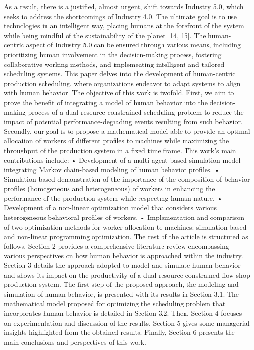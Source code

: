 As a result, there is a justified, almost urgent, shift towards Industry 5.0, which seeks to address the shortcomings of Industry 4.0. The ultimate goal is to use technologies in an intelligent way, placing humans at the forefront of the system while being mindful of the sustainability of the planet [14, 15]. The human-centric aspect of Industry 5.0 can be ensured through various means, including prioritizing human involvement in the decision-making process, fostering collaborative working methods, and implementing intelligent and tailored scheduling systems.
This paper delves into the development of human-centric production scheduling, where organizations endeavor to adapt systems to align with human behavior. The objective of this work is twofold. First, we aim to prove the benefit of integrating a model of human behavior into the decision-making process of a dual-resource-constrained scheduling problem to reduce the impact of potential performance-degrading events resulting from such behavior. Secondly, our goal is to propose a mathematical model able to provide an optimal allocation of workers of different profiles to machines while maximizing the throughput of the production system in a fixed time frame.
This work’s main contributions include:
•	Development of a multi-agent-based simulation model integrating Markov chain-based modeling of human behavior profiles.
•	Simulation-based demonstration of the importance of the composition of behavior profiles (homogeneous and heterogeneous) of workers in enhancing the performance of the production system while respecting human nature.
•	Development of a non-linear optimization model that considers various heterogeneous behavioral profiles of workers.
•	Implementation and comparison of two optimization methods for worker allocation to machines: simulation-based and non-linear programming optimization.
The rest of the article is structured as follows. Section 2 provides a comprehensive literature review encompassing various perspectives on how human behavior is approached within the industry. Section 3 details the approach adopted to model and simulate human behavior and shows its impact on the productivity of a dual-resource-constrained flow-shop production system. The first step of the proposed approach, the modeling and simulation of human behavior, is presented with its results in Section 3.1. The mathematical model proposed for optimizing the scheduling problem that incorporates human behavior is detailed in Section 3.2. Then, Section 4 focuses on experimentation and discussion of the results. Section 5 gives some managerial insights highlighted from the obtained results. Finally, Section 6 presents the main conclusions and perspectives of this work.

